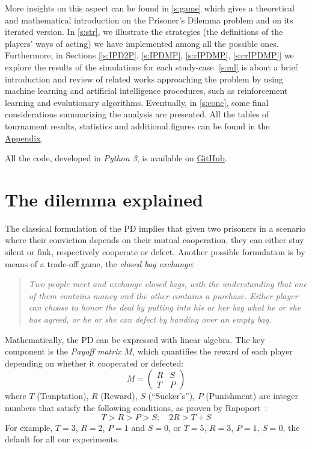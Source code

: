 \documentclass[journal,10pt,twoside]{IEEEtran}
\begin{document}
More insights on this aspect can be found in \autoref{s:game} which gives a theoretical and mathematical introduction on the Prisoner's Dilemma problem and on its iterated version.
In \autoref{s:str}, we illustrate the strategies (the definitions of the players' ways of acting) we have implemented among all the possible ones.
Furthermore, in Sections [\ref{s:IPD2P}, \ref{s:IPDMP}, \ref{s:rIPDMP}, \ref{s:crIPDMP}] we explore the results of the simulations for each study-case.
\autoref{s:ml} is about a brief introduction and review of related works approaching the problem by using machine learning and artificial intelligence procedures, such as reinforcement learning and evolutionary algorithms.
Eventually, in \autoref{s:conc}, some final considerations summarizing the analysis are presented.
All the tables of tournament results, statistics and additional figures can be found in the \hyperref[s:appendix]{Appendix}.

All the code, developed in \textit{Python 3}, is available on \href{https://github.com/eliabntt/LaboratoryOfComputationalPhysics/tree/Group9}{GitHub}.

\section{The dilemma explained} \label{s:game}
The classical formulation of the PD implies that given two prisoners in a scenario where their conviction depends on their mutual cooperation, they can either stay silent or fink, respectively cooperate or defect.
Another possible formulation is by means of a trade-off game, the \textit{closed bag exchange}:

\begin{quote}
\textit{Two people meet and exchange closed bags, with the understanding that one of them contains money and the other contains a purchase. Either player can choose to honor the deal by putting into his or her bag what he or she has agreed, or he or she can defect by handing over an empty bag.}
\end{quote}

Mathematically, the PD can be expressed with linear algebra. The key component is the \textit{Payoff matrix} $M$, which quantifies the reward of each player depending on whether it cooperated or defected:
$$
M = 
\begin{pmatrix} 
R & S \\
T & P 
\end{pmatrix}
$$
where $T$ (Temptation), $R$ (Reward), $S$ (``Sucker's''), $P$ (Punishment) are integer numbers that satisfy the following conditions, as proven by Rapoport~\cite{rapoport}:
$$
T>R>P>S; \quad 2R > T+S 
$$
For example, $T=3$, $R=2$, $P=1$ and $S=0$, or  $T=5$, $R=3$, $P=1$, $S=0$, the default for all our experiments.
\end{document}
